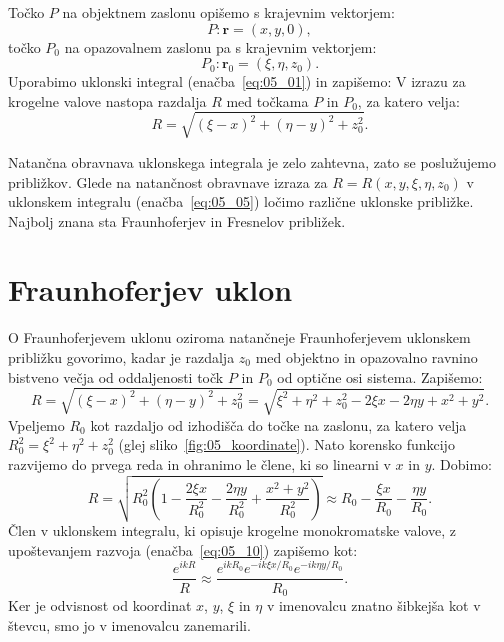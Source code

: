 Točko $P$ na objektnem zaslonu opišemo s krajevnim vektorjem:
\begin{equation}
P: \mathbf{r} = (x,y,0),
\label{eq:05_03}
\end{equation}
točko $P_0$ na opazovalnem zaslonu pa s krajevnim vektorjem:
\begin{equation}
P_0: \mathbf{r}_0 = (\xi,\eta,z_0).
\label{eq:05_04}
\end{equation}
Uporabimo uklonski integral (enačba~\ref{eq:05_01}) in zapišemo:
V izrazu za krogelne valove nastopa razdalja $R$ med točkama $P$ in $P_0$, za
katero velja:
\begin{equation}
R = \sqrt{(\xi-x)^2 + (\eta - y)^2 + z_0^2}.
\label{eq:05_06}
\end{equation}

Natančna obravnava uklonskega integrala je zelo zahtevna, zato se poslužujemo približkov.
Glede na natančnost obravnave izraza za $R = R(x,y,\xi, \eta, z_0)$ v uklonskem
integralu (enačba~\ref{eq:05_05}) ločimo različne uklonske približke. Najbolj 
znana sta Fraunhoferjev in Fresnelov približek.

\section{Fraunhoferjev uklon}
\label{chap:Fraunhofer}
O Fraunhoferjevem uklonu oziroma natančneje Fraunhoferjevem uklonskem približku govorimo,
kadar je razdalja $z_0$ med objektno in opazovalno ravnino bistveno večja od oddaljenosti
točk $P$ in $P_0$ od optične osi sistema. Zapišemo:
\begin{equation}
R = \sqrt{(\xi-x)^2 + (\eta - y)^2 + z_0^2} =
\sqrt{\xi^2+\eta^2 +z_0^2 - 2\xi x - 2 \eta y + x^2 + y^2}.
\label{eq:05_07}
\end{equation}
Vpeljemo $R_0$ kot razdaljo od izhodišča do točke na zaslonu, za katero velja 
$R_0^2 = \xi^2 + \eta^2 + z_0^2$ (glej sliko~\ref{fig:05_koordinate}). Nato korensko
funkcijo razvijemo do prvega reda in ohranimo le člene, ki so linearni v $x$ in $y$. 
Dobimo:
\begin{equation}
R = \sqrt{R_0^2 \left(1 - \frac{2\xi x}{R_0^2} - \frac{2\eta y}{R_0^2} + \frac{x^2+y^2}{R_0^2}
\right)} \approx 
R_0 - \frac{\xi x}{R_0} - \frac{\eta y}{R_0}.
\label{eq:05_10}
\end{equation}
Člen v uklonskem integralu, ki opisuje krogelne monokromatske valove, z upoštevanjem razvoja
(enačba~\ref{eq:05_10}) zapišemo kot:
\begin{equation}
\frac{e^{ikR}}{R} \approx \frac{e^{ikR_0} e^{-ik\xi x /R_0} e^{-ik\eta y/R_0}}{R_0}.
\label{eq:05_11}
\end{equation}
Ker je odvisnost od koordinat $x$, $y$, $\xi$ in $\eta$ v imenovalcu znatno 
šibkejša kot v števcu, smo jo v imenovalcu zanemarili. 


